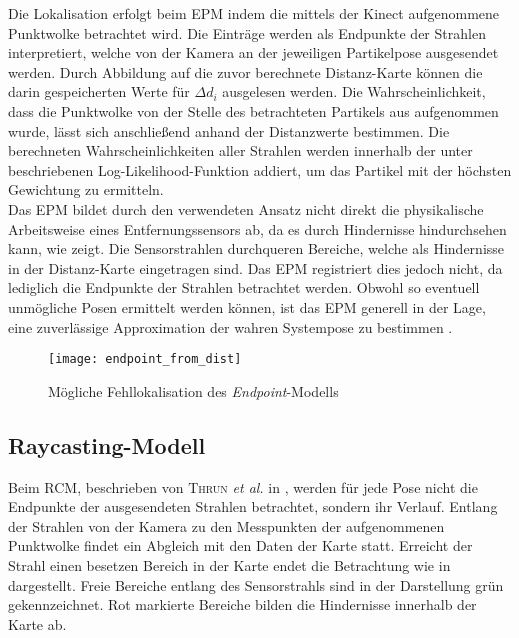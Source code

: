 Die Lokalisation erfolgt beim EPM indem die mittels der Kinect aufgenommene Punktwolke betrachtet wird. Die Einträge werden als Endpunkte der Strahlen interpretiert, welche von der Kamera an der jeweiligen Partikelpose ausgesendet werden. Durch Abbildung auf die zuvor berechnete Distanz-Karte können die darin gespeicherten Werte für ${\Delta d}_i$ ausgelesen werden. Die Wahrscheinlichkeit, dass die Punktwolke von der Stelle des betrachteten Partikels aus aufgenommen wurde, lässt sich anschließend anhand der Distanzwerte bestimmen. Die berechneten Wahrscheinlichkeiten aller Strahlen werden innerhalb der unter  beschriebenen Log-Likelihood-Funktion addiert, um das Partikel mit der höchsten Gewichtung zu ermitteln.\\

Das EPM bildet durch den verwendeten Ansatz nicht direkt die physikalische Arbeitsweise eines Entfernungssensors ab, da es durch Hindernisse \glqq hindurchsehen\grqq{} kann, wie  zeigt. Die Sensorstrahlen durchqueren Bereiche, welche als Hindernisse in der Distanz-Karte eingetragen sind. Das EPM registriert dies jedoch nicht, da lediglich die Endpunkte der Strahlen betrachtet werden. Obwohl so eventuell unmögliche Posen ermittelt werden können, ist das EPM generell in der Lage, eine zuverlässige Approximation der wahren Systempose zu bestimmen \cite{Konolige1999}.

\begin{figure}[!ht]
	\begin{center}
		\texttt{[image: endpoint\_from\_dist]}
		\caption{Mögliche Fehllokalisation des \textit{Endpoint}-Modells}
		\label{fig.endpoint}
	\end{center}
\end{figure}

\subsection{Raycasting-Modell}
Beim RCM, beschrieben von \textsc{Thrun} \textit{et al.} in \cite{Thrun2005}, werden für jede Pose nicht die Endpunkte der ausgesendeten Strahlen betrachtet, sondern ihr Verlauf. Entlang der Strahlen von der Kamera zu den Messpunkten der aufgenommenen Punktwolke findet ein Abgleich mit den Daten der Karte statt. Erreicht der Strahl einen besetzen Bereich in der Karte endet die Betrachtung wie in  dargestellt. Freie Bereiche entlang des Sensorstrahls sind in der Darstellung grün gekennzeichnet. Rot markierte Bereiche bilden die Hindernisse innerhalb der Karte ab.\\

